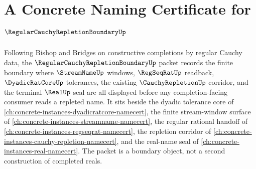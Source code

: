 \chapter{A Concrete Naming Certificate for $\RegularCauchyRepletionBoundaryUp$}
\label{ch:concrete-instances-regular-cauchy-repletion-boundary-namecert}

Following Bishop and Bridges on constructive completions by regular Cauchy data, the $\RegularCauchyRepletionBoundaryUp$ packet records the finite boundary where $\StreamNameUp$ windows, $\RegSeqRatUp$ readback, $\DyadicRatCoreUp$ tolerances, the existing $\CauchyRepletionUp$ corridor, and the terminal $\RealUp$ seal are all displayed before any completion-facing consumer reads a repleted name. It sits beside the dyadic tolerance core of \autoref{ch:concrete-instances-dyadicratcore-namecert}, the finite stream-window surface of \autoref{ch:concrete-instances-streamname-namecert}, the regular rational handoff of \autoref{ch:concrete-instances-regseqrat-namecert}, the repletion corridor of \autoref{ch:concrete-instances-cauchy-repletion-namecert}, and the real-name seal of \autoref{ch:concrete-instances-real-namecert}. The packet is a boundary object, not a second construction of completed reals.

